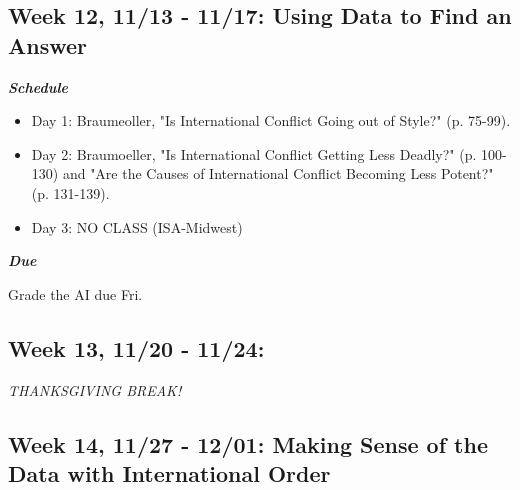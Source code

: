 \documentclass[11pt,]{article}
\begin{document}
\hypertarget{week-12-1113---1117-using-data-to-find-an-answer}{%
\subsection{Week 12, 11/13 - 11/17: Using Data to Find an
Answer}\label{week-12-1113---1117-using-data-to-find-an-answer}}

\begin{multicols}{2}

\textbf{\textit{Schedule}}

\begin{itemize}

\item Day 1: Braumeoller, "Is International Conflict Going out of Style?" (p. 75-99).

\item Day 2: Braumoeller, "Is International Conflict Getting Less Deadly?" (p. 100-130) and "Are the Causes of International Conflict Becoming Less Potent?" (p. 131-139).

\item Day 3: NO CLASS (ISA-Midwest)

\end{itemize}

\columnbreak

\begin{flushright}

\textbf{\textit{Due}}

Grade the AI due Fri.

\end{flushright}

\end{multicols}

\hypertarget{week-13-1120---1124}{%
\subsection{Week 13, 11/20 - 11/24:}\label{week-13-1120---1124}}

\emph{THANKSGIVING BREAK!}

\hypertarget{week-14-1127---1201-making-sense-of-the-data-with-international-order}{%
\subsection{Week 14, 11/27 - 12/01: Making Sense of the Data with
International
Order}\label{week-14-1127---1201-making-sense-of-the-data-with-international-order}}
\end{document}
